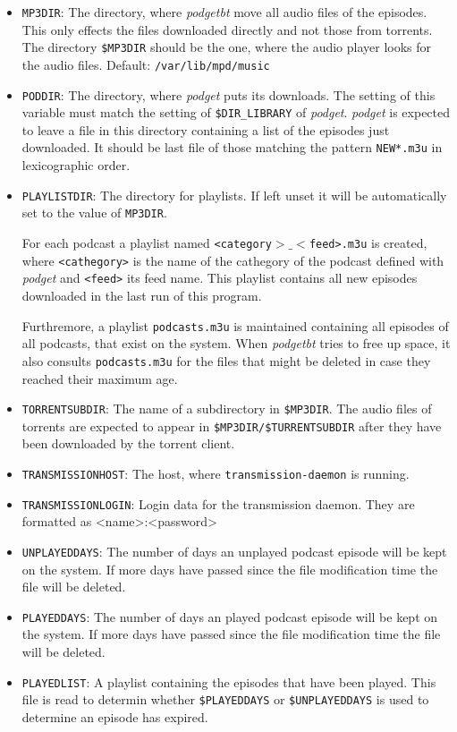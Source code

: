 \begin{itemize}
\item \texttt{MP3DIR}:
  The directory, where \emph{podgetbt} move all audio files of the episodes.
  This only effects the files downloaded directly and not those
  from torrents.
  The directory \texttt{\$MP3DIR} 
  should be the one, where the audio player looks for the audio files.
  Default: \texttt{/var/lib/mpd/music}
\item \texttt{PODDIR}:
  The directory, where \emph{podget}  puts its downloads.
  The setting of this variable must match the setting
  of \texttt{\$DIR\_LIBRARY} of \emph{podget}.
  \emph{podget} is expected to leave a file in this directory
  containing a list of the episodes just downloaded.
  It should be last file of those matching 
  the pattern \texttt{NEW*.m3u} in lexicographic order.
\item \texttt{PLAYLISTDIR}:
  The directory for playlists. If left unset it will be automatically set
  to the value of \texttt{MP3DIR}.

  For each podcast a playlist named 
  \texttt{\textless{}category$>\_<$feed\textgreater{}.m3u}
  is created, where \texttt{\textless{}cathegory\textgreater{}} 
  is the name of the cathegory of
  the podcast defined with \emph{podget} and 
  \texttt{\textless{}feed\textgreater{}} its feed name.
  This playlist contains all new episodes downloaded in the 
  last run of this program.

  Furthremore, a playlist \texttt{podcasts.m3u} is maintained containing all episodes
  of all podcasts, that exist on the system. 
  When \emph{podgetbt} tries to free up space, it also consults
  \texttt{podcasts.m3u} for the files that might be deleted
  in case they reached their maximum age.
\item \texttt{TORRENTSUBDIR}: 
  The name of a subdirectory in \texttt{\$MP3DIR}. The audio files of torrents
  are expected to appear in \texttt{\$MP3DIR/\$TURRENTSUBDIR} after they have
  been downloaded by the torrent client.
\item \texttt{TRANSMISSIONHOST}:
  The host, where \texttt{transmission-daemon} is running.
\item \texttt{TRANSMISSIONLOGIN}:
  Login data for the transmission daemon. 
  They are formatted as \textless name\textgreater:\textless password\textgreater 
\item \texttt{UNPLAYEDDAYS}:
  The number of days an unplayed podcast episode will be kept on the system.
  If more days have passed since the file modification time the file will be 
  deleted.
\item \texttt{PLAYEDDAYS}:
  The number of days an played podcast episode will be kept on the system.
  If more days have passed since the file modification time the file will be 
  deleted.
\item \texttt{PLAYEDLIST}:
  A playlist containing the episodes that have been played.
  This file is read to determin whether \texttt{\$PLAYEDDAYS} or
  \texttt{\$UNPLAYEDDAYS} is used to determine an episode has expired.
  

\end{itemize}
